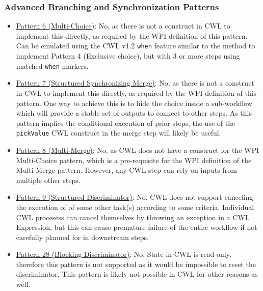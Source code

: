 \subsubsection{Advanced Branching and Synchronization Patterns}
\begin{itemize}
\item \href{http://www.workflowpatterns.com/patterns/control/advanced_branching/wcp6.php}{Pattern 6 (Multi-Choice)}: No, as there is not a construct in CWL to implement this directly, as required by the WPI definition of this pattern. Can be emulated using the CWL v1.2 \verb|when| feature similar to the method to implement Pattern 4 (Exclusive choice), but with 3 or more steps using matched \verb|when| markers.

\item \href{http://www.workflowpatterns.com/patterns/control/advanced_branching/wcp7.php}{Pattern 7 (Structured Synchronizing Merge)}: No, as there is not a construct in CWL to implement this directly, as required by the WPI definition of this pattern. One way to achieve this is to hide the choice inside a sub-workflow which will provide a stable set of outputs to connect to other steps. As this pattern implies the conditional execution of prior steps, the use of the \verb|pickValue| CWL construct in the merge step will likely be useful.

\item \href{http://www.workflowpatterns.com/patterns/control/advanced_branching/wcp8.php}{Pattern 8 (Multi-Merge)}: No, as CWL does not have a construct for the WPI Multi-Choice pattern, which is a pre-requisite for the WPI definition of the Multi-Merge pattern. However, any CWL step can rely on inputs from multiple other steps.

\item \href{http://www.workflowpatterns.com/patterns/control/advanced_branching/wcp9.php}{Pattern 9 (Structured Discriminator)}: No. CWL does not support canceling the execution of of some other task(s) according to some criteria. Individual CWL procesess can cancel themselves by throwing an exception in a CWL Expression, but this can cause premature failure of the entire workflow if not carefully planned for in downstream steps.

\item \href{http://www.workflowpatterns.com/patterns/control/new/wcp28.php}{Pattern 28 (Blocking Discriminator)}: No. State in CWL is read-only, therefore this pattern is not supported as it would be impossible to reset the discriminator. This pattern is likely not possible in CWL for other reasons as well.


\end{itemize}
